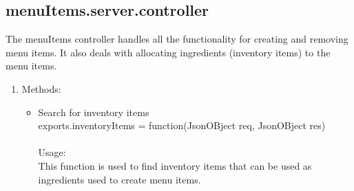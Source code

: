 \documentclass[a4paper,12pt]{article}
\begin{document}
\subsection{menuItems.server.controller}
 The menuItems controller handles all the functionality for creating and removing menu items. It also deals with allocating ingredients (inventory items) to the menu items.
\begin{enumerate}
\item Methods:
	\begin{itemize}
	\item Search for inventory items\\ exports.inventoryItems = function(JsonOBject req, JsonOBject res)\\ \\
  	Usage: \\
  	This function is used to find inventory items that can be used as ingredients used to create menu items.
	

\end{itemize}
\end{enumerate}
\end{document}
